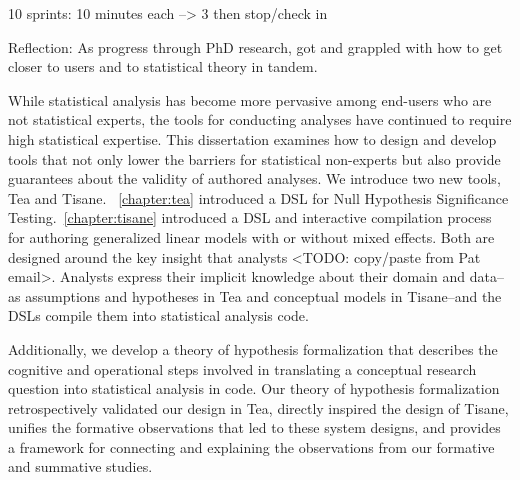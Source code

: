 10 sprints: 10 minutes each --> 3 then stop/check in


Reflection: As progress through PhD research, got and grappled with how to get
closer to users and to statistical theory in tandem.




While statistical analysis has become more pervasive among end-users who are not
statistical experts, the tools for conducting analyses have continued to require
high statistical expertise. This dissertation examines how to design and develop
tools that not only lower the barriers for statistical non-experts but also
provide guarantees about the validity of authored analyses. We introduce two new
tools, Tea and Tisane. ~\autoref{chapter:tea} introduced a DSL for Null
Hypothesis Significance Testing.~\autoref{chapter:tisane} introduced a DSL and
interactive compilation process for authoring generalized linear models with or
without mixed effects. Both are designed around the key insight that analysts
<TODO: copy/paste from Pat email>. Analysts express their implicit knowledge
about their domain and data--as assumptions and hypotheses in Tea and conceptual
models in Tisane--and the DSLs compile them into statistical analysis code. 

Additionally, we develop a theory of hypothesis formalization that describes the
cognitive and operational steps involved in translating a conceptual research
question into statistical analysis in code. Our theory of hypothesis
formalization retrospectively validated our design in Tea, directly inspired the
design of Tisane, unifies the formative observations that led to these system
designs, and provides a framework for connecting and explaining the observations
from our formative and summative studies. 

